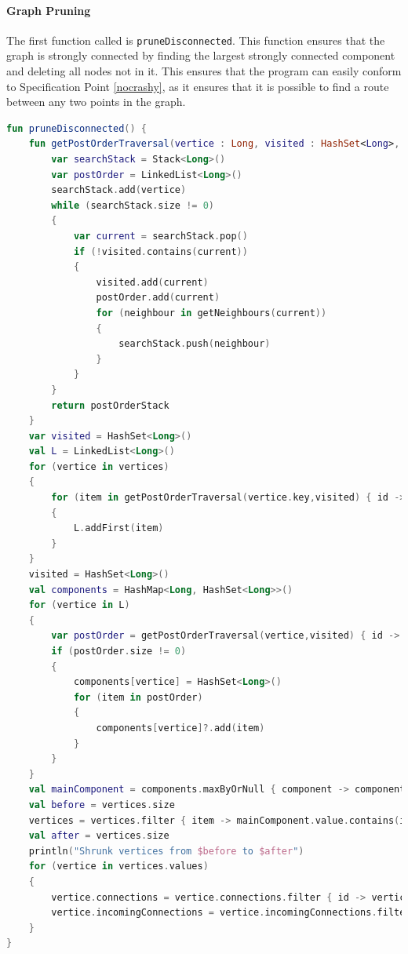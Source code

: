 \documentclass[11pt,twoside,a4paper]{report}
\begin{document}
\paragraph{Graph Pruning}
The first function called is \texttt{pruneDisconnected}. This function ensures that the graph is strongly connected by finding the largest strongly connected component and deleting all nodes not in it. This ensures that the program can easily 
conform to Specification Point \ref{nocrashy}, as it ensures that it is possible to find a route between any two points in the graph. 
\begin{lstlisting}[language=kotlin]
fun pruneDisconnected() {
    fun getPostOrderTraversal(vertice : Long, visited : HashSet<Long>, getNeighbours : (Long) -> HashSet<Long>): List<Long> {
        var searchStack = Stack<Long>()
        var postOrder = LinkedList<Long>()
        searchStack.add(vertice)
        while (searchStack.size != 0)
        {
            var current = searchStack.pop()
            if (!visited.contains(current))
            {
                visited.add(current)
                postOrder.add(current)
                for (neighbour in getNeighbours(current))
                {
                    searchStack.push(neighbour)
                }
            }
        }
        return postOrderStack
    }
    var visited = HashSet<Long>()
    val L = LinkedList<Long>()
    for (vertice in vertices)
    {
        for (item in getPostOrderTraversal(vertice.key,visited) { id -> vertices[id]!!.connections })
        {
            L.addFirst(item)
        }
    }
    visited = HashSet<Long>()
    val components = HashMap<Long, HashSet<Long>>()
    for (vertice in L)
    {
        var postOrder = getPostOrderTraversal(vertice,visited) { id -> vertices[id]!!.incomingConnections }
        if (postOrder.size != 0)
        {
            components[vertice] = HashSet<Long>()
            for (item in postOrder)
            {
                components[vertice]?.add(item)
            }
        }
    }
    val mainComponent = components.maxByOrNull { component -> component.value.size }!!
    val before = vertices.size
    vertices = vertices.filter { item -> mainComponent.value.contains(item.key) } as HashMap<Long, GeographicNode>
    val after = vertices.size
    println("Shrunk vertices from $before to $after")
    for (vertice in vertices.values)
    {
        vertice.connections = vertice.connections.filter { id -> vertices.containsKey(id) }.toHashSet()
        vertice.incomingConnections = vertice.incomingConnections.filter { id -> vertices.containsKey(id)}.toHashSet()
    }
}
\end{lstlisting}
\end{document}
